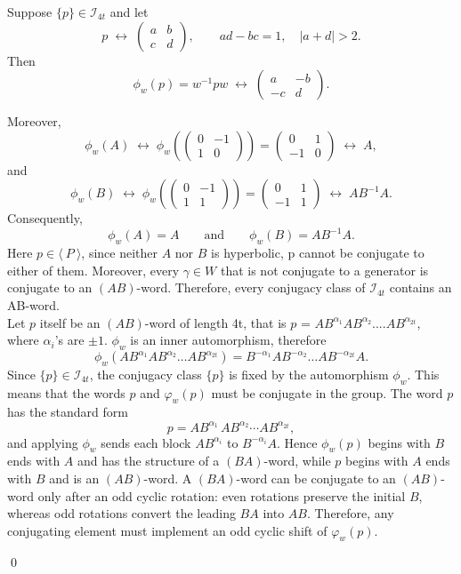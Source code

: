 \documentclass[a4paper,12pt]{amsart}
\renewenvironment{proof}{{\bfseries Proof.}}{\qed}
\numberwithin{equation}{section}
\theoremstyle{definition}
\numberwithin{equation}{section}
\begin{document}
\begin{proof}
Suppose $\{p\}\in \mathscr I_{4t}$ and let
$$
p \;\longleftrightarrow\;
\begin{pmatrix}
a & b\\
c & d
\end{pmatrix},
\qquad ad-bc=1,\quad |a+d|>2.
$$
Then
$$
\phi_w(p)=w^{-1}pw
\;\longleftrightarrow\;
\begin{pmatrix}
a & -b\\
-c & d
\end{pmatrix}.
$$

Moreover,
$$
\phi_w(A)
\;\longleftrightarrow\;
\phi_w\!\left(
\begin{pmatrix}
0 & -1\\
1 & 0
\end{pmatrix}\right)
=
\begin{pmatrix}
0 & 1\\
-1 & 0
\end{pmatrix}
\;\longleftrightarrow\; A,
$$
and
$$
\phi_w(B)
\;\longleftrightarrow\;
\phi_w\!\left(
\begin{pmatrix}
0 & -1\\
1 & 1
\end{pmatrix}\right)
=
\begin{pmatrix}
0 & 1\\
-1 & 1
\end{pmatrix}
\;\longleftrightarrow\; AB^{-1}A.
$$
Consequently,
$$
\phi_w(A)=A
\qquad\text{and}\qquad
\phi_w(B)=AB^{-1}A.
$$
Here $p \in\langle~ P ~\rangle$, since neither $A$ nor $B$ is hyperbolic, p cannot be conjugate to either of them. Moreover, every $\gamma \in W$ that is not conjugate to a generator is conjugate to an $(AB)$-word. Therefore, every conjugacy class of $\mathscr{I}_{4t}$ contains an AB-word.\\ Let $p$ itself be an $(AB)$-word of length 4t, that is $p$ = $AB^{\alpha_1}AB^{\alpha_2}....AB^{\alpha_{2t}}$, where $\alpha_i$'s are $\pm1$. $\phi_w$ is an inner automorphism, therefore $$\phi_w(AB^{\alpha_1}AB^{\alpha_2}\dots AB^{\alpha_{2t}}) = B^{-\alpha_1}AB^{-\alpha_2}\dots AB^{-\alpha_{2t}}A.$$
 Since $\{p\}\in \mathscr{I}_{4t}$, the conjugacy class $\{p\}$ is fixed by the automorphism 
$\phi_{w}$. This means that the words $p$ and $\varphi_{w}(p)$ must be conjugate in the 
group. The word $p$ has the standard form
\[
p = AB^{\alpha_1}\, AB^{\alpha_2}\cdots AB^{\alpha_{2t}},
\]
and applying $\phi_{w}$ sends each block $AB^{\alpha_i}$ to $B^{-\alpha_i}A$. Hence 
$\phi_{w}(p)$ begins with $B$ ends with $A$ and has the structure of a $(BA)$-word, while $p$ begins 
with $A$ ends with $B$ and is an $(AB)$-word. A $(BA)$-word can be conjugate to an $(AB)$-word only after 
an odd cyclic rotation: even rotations preserve the initial $B$, whereas odd rotations 
convert the leading $BA$ into $AB$. Therefore, any conjugating element must implement an odd 
cyclic shift of $\varphi_{w}(p)$.


\end{proof}
\end{document}

